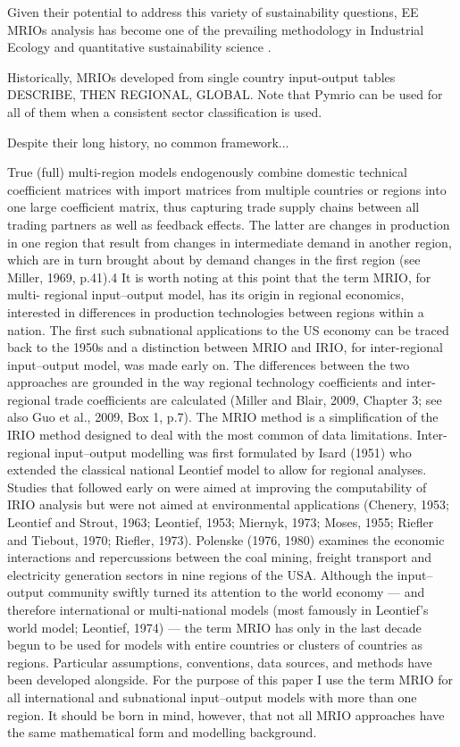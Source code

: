 \documentclass{jors}
\begin{document}
{Given their potential to address this variety of sustainability questions, EE MRIOs analysis has become one of the prevailing methodology in Industrial Ecology and quantitative sustainability science \cite{davis2010a,ivanova2017,tukker2016,verones2015,wood2018,wood2018a}.

Historically, MRIOs developed from single country input-output tables 
DESCRIBE, THEN REGIONAL, GLOBAL. Note that Pymrio can be used for all of them when a consistent sector classification is used.

Despite their long history, no common framework...


True (full) multi-region models endogenously combine domestic
technical coefficient matrices with import matrices from multiple
countries or regions into one large coefficient matrix, thus capturing
trade supply chains between all trading partners as well as feedback
effects. The latter are changes in production in one region that result
from changes in intermediate demand in another region, which are in
turn brought about by demand changes in the first region (see Miller,
1969, p.41).4
It is worth noting at this point that the term MRIO, for multi-
regional input–output model, has its origin in regional economics,
interested in differences in production technologies between regions
within a nation. The first such subnational applications to the US
economy can be traced back to the 1950s and a distinction between
MRIO and IRIO, for inter-regional input–output model, was made
early on. The differences between the two approaches are grounded in
the way regional technology coefficients and inter-regional trade
coefficients are calculated (Miller and Blair, 2009, Chapter 3; see also
Guo et al., 2009, Box 1, p.7). The MRIO method is a simplification of the
IRIO method designed to deal with the most common of data
limitations.
Inter-regional input–output modelling was first formulated by
Isard (1951) who extended the classical national Leontief model to
allow for regional analyses. Studies that followed early on were aimed
at improving the computability of IRIO analysis but were not aimed at
environmental applications (Chenery, 1953; Leontief and Strout,
1963; Leontief, 1953; Miernyk, 1973; Moses, 1955; Riefler and
Tiebout, 1970; Riefler, 1973). Polenske (1976, 1980) examines the
economic interactions and repercussions between the coal mining,
freight transport and electricity generation sectors in nine regions of
the USA.
Although the input–output community swiftly turned its attention
to the world economy — and therefore international or multi-national
models (most famously in Leontief's world model; Leontief, 1974) —
the term MRIO has only in the last decade begun to be used for models
with entire countries or clusters of countries as regions. Particular
assumptions, conventions, data sources, and methods have been
developed alongside. For the purpose of this paper I use the term
MRIO for all international and subnational input–output models with
more than one region. It should be born in mind, however, that not all
MRIO approaches have the same mathematical form and modelling
background.


}
\end{document}
